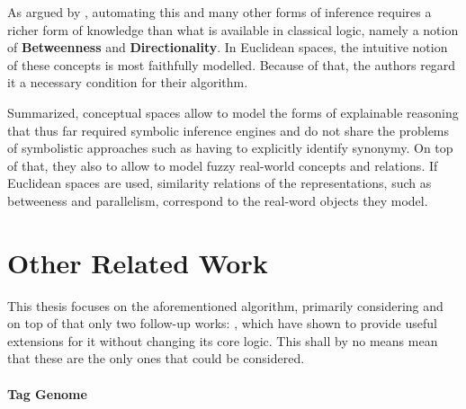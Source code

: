 
As argued by \textcite{Derrac2015}, automating this and many other forms of inference requires a richer form of knowledge than what is available in classical logic, namely a notion of \textbf{Betweenness} and \textbf{Directionality}. In Euclidean spaces, the intuitive notion of these concepts is most faithfully modelled. Because of that, the authors regard it a necessary condition for their algorithm.

Summarized, conceptual spaces allow to model the forms of explainable reasoning that thus far required symbolic inference engines and do not share the problems of symbolistic approaches such as having to explicitly identify synonymy. On top of that, they also to allow to model fuzzy real-world concepts and relations. If Euclidean spaces are used, similarity relations of the representations, such as betweeness and parallelism, correspond to the real-word objects they model.



\section{Other Related Work}
\label{sec:otherwork}

This thesis focuses on the aforementioned algorithm, primarily considering \cite{Derrac2015} and on top of that only two follow-up works: \cite{Ager2018, Alshaikh2020}, which have shown to provide useful extensions for it without changing its core logic. This shall by no means mean that these are the only ones that could be considered.

\paragraph{Tag Genome} 

